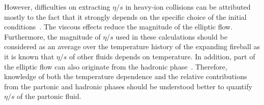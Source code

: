 \documentclass[ALICE,manyauthors]{cernphprep}
\begin{document}
However, difficulties on extracting $\eta/s$ in heavy-ion collisions can be attributed mostly to the fact that it strongly depends on the specific choice of the initial conditions~\cite{Romatschke:2007mq,Luzum:2012wu,Shen:2011zc}.
The viscous effects reduce the magnitude of the elliptic flow. Furthermore, the magnitude of $\eta/s$ used in these calculations should be considered as an average over the temperature history of the expanding fireball as it is known that $\eta/s$ of other fluids depends on temperature. 
In addition, part of the elliptic flow can also originate from the hadronic phase~\cite{Bozek:2011ua,Rose:2014fba,Ryu:2015vwa}. Therefore,
knowledge of both the temperature dependence and the relative contributions from the partonic and hadronic phases should be understood better to quantify $\eta/s$ of the partonic fluid.
\end{document}
